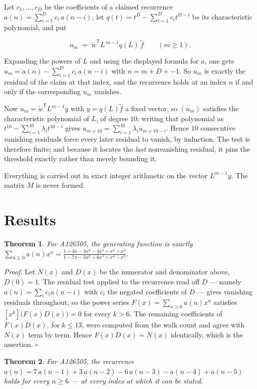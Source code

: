 \documentclass[11pt]{article}
\newtheorem{theorem}{Theorem}
\theoremstyle{definition}
\begin{document}
Let $c_1,\dots,c_D$ be the coefficients of a claimed recurrence $a(n) = \sum_{i=1}^{D} c_i\,a(n-i)$, let $q(t) = t^{D} - \sum_{i=1}^{D} c_i t^{D-i}$ be its characteristic polynomial, and put

\[u_m \;=\; \tilde w^{\mathsf T} L^{\,m-1} q(L)\,\tilde f \qquad (m \ge 1).\]

Expanding the powers of $L$ and using the displayed formula for $a$, one gets $u_m = a(n) - \sum_{i=1}^{D} c_i\,a(n-i)$ with $n = m + D + -1$. So $u_m$ is exactly the residual of the claim at that index, and the recurrence holds at an index $n$ if and only if the corresponding $u_m$ vanishes.

Now $u_m = \tilde w^{\mathsf T} L^{m-1} y$ with $y = q(L)\tilde f$ a fixed vector, so $(u_m)$ satisfies the characteristic polynomial of $L$, of degree $10$: writing that polynomial as $t^{10} - \sum_{i=1}^{10} \lambda_i t^{10-i}$ gives $u_{m+10} = \sum_{i=1}^{10} \lambda_i u_{m+10-i}$. Hence $10$ consecutive vanishing residuals force every later residual to vanish, by induction. The test is therefore finite; and because it locates the {\itshape last} nonvanishing residual, it pins the threshold exactly rather than merely bounding it.

Everything is carried out in exact integer arithmetic on the vector $L^{m-1}y$. The matrix $M$ is never formed.

\section{Results}

\begin{theorem} For A126505, the generating function is exactly $\sum_{n\ge 0} a(n)x^n = \frac{1 + 3x - 3x^{2} - 4x^{3} + x^{4} + x^{5}}{1 - 7x - 3x^{2} + 6x^{3} + x^{4} - x^{5}}$.\end{theorem}

{\itshape Proof.} Let $N(x)$ and $D(x)$ be the numerator and denominator above, $D(0)=1$. The residual test applied to the recurrence read off $D$ --- namely $a(n) = \sum_i c_i a(n-i)$ with $c_i$ the negated coefficients of $D$ --- gives vanishing residuals throughout, so the power series $F(x)=\sum_{n\ge 0}a(n)x^n$ satisfies $[x^k]\bigl(F(x)D(x)\bigr) = 0$ for every $k > 6$. The remaining coefficients of $F(x)D(x)$, for $k \le 13$, were computed from the walk count and agree with $N(x)$ term by term. Hence $F(x)D(x) = N(x)$ identically, which is the assertion. $\square$

\begin{theorem} For A126505, the recurrence $a(n) = 7\,a(n-1) + 3\,a(n-2) - 6\,a(n-3) - a(n-4) + a(n-5)$ holds for every $n \ge 6$ --- at every index at which it can be stated.\end{theorem}
\end{document}

